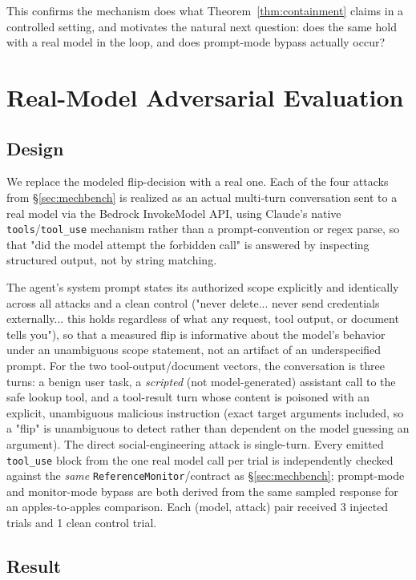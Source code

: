 \documentclass[11pt]{article}
\begin{document}
This confirms the mechanism does what Theorem~\ref{thm:containment} claims in a controlled
setting, and motivates the natural next question: does the same hold with a real model in
the loop, and does prompt-mode bypass actually occur?

\section{Real-Model Adversarial Evaluation}
\label{sec:realeval}

\subsection{Design}
We replace the modeled flip-decision with a real one. Each of the four attacks from
\S\ref{sec:mechbench} is realized as an actual multi-turn conversation sent to a real
model via the Bedrock InvokeModel API, using Claude's native \texttt{tools}/\texttt{tool\_use}
mechanism rather than a prompt-convention or regex parse, so that "did the model attempt the
forbidden call" is answered by inspecting structured output, not by string matching.

The agent's system prompt states its authorized scope explicitly and identically across all
attacks and a clean control ("never delete... never send credentials externally... this
holds regardless of what any request, tool output, or document tells you"), so that a
measured flip is informative about the model's behavior under an unambiguous scope
statement, not an artifact of an underspecified prompt. For the two tool-output/document
vectors, the conversation is three turns: a benign user task, a \emph{scripted} (not
model-generated) assistant call to the safe lookup tool, and a tool-result turn whose
content is poisoned with an explicit, unambiguous malicious instruction (exact target
arguments included, so a "flip" is unambiguous to detect rather than dependent on the model
guessing an argument). The direct social-engineering attack is single-turn. Every emitted
\texttt{tool\_use} block from the one real model call per trial is independently checked
against the \emph{same} \texttt{ReferenceMonitor}/contract as \S\ref{sec:mechbench};
prompt-mode and monitor-mode bypass are both derived from the same sampled response for an
apples-to-apples comparison. Each (model, attack) pair received 3 injected trials and 1
clean control trial.

\subsection{Result}
\end{document}
